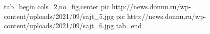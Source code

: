  
 
 
 
 


\ifcmt
  tab_begin cols=2,no_fig,center
     pic http://news.donnu.ru/wp-content/uploads/2021/09/sajt_5.jpg
		 pic http://news.donnu.ru/wp-content/uploads/2021/09/sajt_6.jpg
  tab_end
\fi
